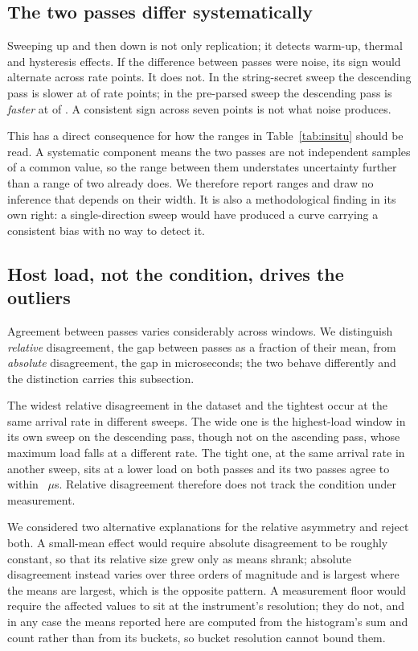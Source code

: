 \documentclass[pdflatex,sn-basic,twocolumn]{sn-jnl}%
\begin{document}
\subsection{The two passes differ systematically}\label{sec:drift}

Sweeping up and then down is not only replication; it detects warm-up, thermal
and hysteresis effects. If the difference between passes were noise, its sign
would alternate across rate points. It does not. In the string-secret sweep the
descending pass is slower at \InsituStringSameSign{} of \InsituStringPoints{}
rate points; in the pre-parsed sweep the descending pass is \emph{faster} at
\InsituPreparsedSameSign{} of \InsituPreparsedPoints. A consistent sign across
seven points is not what noise produces.

This has a direct consequence for how the ranges in Table~\ref{tab:insitu} should
be read. A systematic component means the two passes are not independent samples
of a common value, so the range between them understates uncertainty further than
a range of two already does. We therefore report ranges and draw no inference that
depends on their width. It is also a methodological finding in its own right: a
single-direction sweep would have produced a curve carrying a consistent bias with
no way to detect it.

\subsection{Host load, not the condition, drives the outliers}\label{sec:load}

Agreement between passes varies considerably across windows. We distinguish
\emph{relative} disagreement, the gap between passes as a fraction of their mean,
from \emph{absolute} disagreement, the gap in microseconds; the two behave
differently and the distinction carries this subsection.

The widest relative disagreement in the dataset and the tightest occur at the same
arrival rate in different sweeps. The wide one is the highest-load window in its
own sweep on the descending pass, though not on the ascending pass, whose maximum
load falls at a different rate. The tight one, at the same arrival rate in another
sweep, sits at a lower load on both passes and its two passes agree to within
\InsituTightestAgreement~$\mu$s. Relative disagreement therefore does not track
the condition under measurement.

We considered two alternative explanations for the relative asymmetry and reject
both. A small-mean effect would require absolute disagreement to be roughly
constant, so that its relative size grew only as means shrank; absolute
disagreement instead varies over three orders of magnitude and is largest where
the means are largest, which is the opposite pattern. A measurement floor would
require the affected values to sit at the instrument's resolution; they do not,
and in any case the means reported here are computed from the histogram's sum and
count rather than from its buckets, so bucket resolution cannot bound them.
\end{document}
